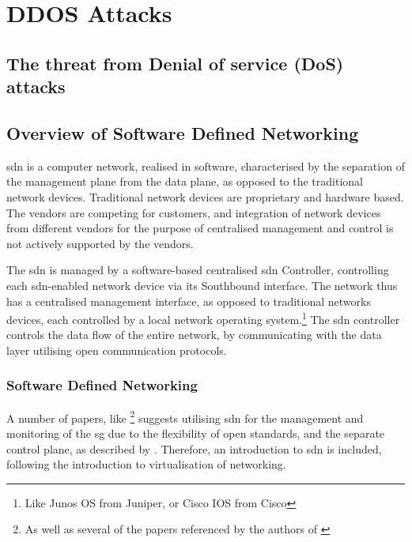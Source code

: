 
\chapter{DDOS Attacks}


\section{The threat from Denial of service (DoS) attacks}









\section{Overview of Software Defined Networking}

\acrfull{sdn} is a computer network, realised in software, characterised by the separation of the management plane from the data plane, as opposed to the traditional  network devices. Traditional network devices are proprietary and hardware based. The vendors are competing for customers, and integration of network devices from different vendors for the purpose of centralised management and control is not actively supported by the vendors.


The \acrfull{sdn} is managed by a software-based centralised \acrshort{sdn} Controller, controlling each \acrshort{sdn}-enabled network device via its Southbound interface. The network thus has a centralised management interface, as opposed to traditional networks devices, each controlled by a local network operating system.\footnote{Like Junos OS from Juniper, or Cisco IOS from Cisco} The \acrshort{sdn} controller controls the data flow of the entire network, by communicating with the data layer utilising open communication protocols.


\subsection{Software Defined Networking}
A number of papers, like \cite{rehmani2019software}\footnote{As well as several of the papers referenced by the authors of \cite{rehmani2019software}} suggests utilising \acrfull{sdn} for the management and monitoring of the \acrshort{sg} due to the flexibility of open standards, and the separate control plane, as described by  \cite{rehmani2019software}. Therefore, an introduction to \acrshort{sdn} is included, following the introduction to virtualisation of networking. 



